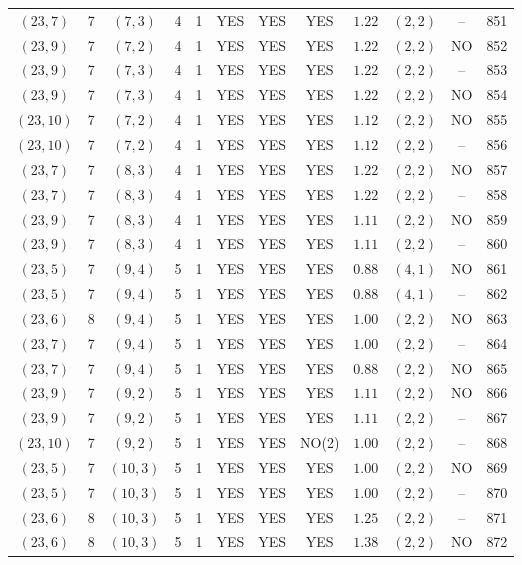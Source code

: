 \begin{longtable}{|c|c|c|c|c|c|c|c|c|c|c|c|}
$(23,7)$ & 7 & $(7,3)$ & 4 & 1 & YES & YES & YES & $1.22$ & $(2,2)$ & -- & 851\\
$(23,9)$ & 7 & $(7,2)$ & 4 & 1 & YES & YES & YES & $1.22$ & $(2,2)$ & NO & 852\\
$(23,9)$ & 7 & $(7,3)$ & 4 & 1 & YES & YES & YES & $1.22$ & $(2,2)$ & -- & 853\\
$(23,9)$ & 7 & $(7,3)$ & 4 & 1 & YES & YES & YES & $1.22$ & $(2,2)$ & NO & 854\\
$(23,10)$ & 7 & $(7,2)$ & 4 & 1 & YES & YES & YES & $1.12$ & $(2,2)$ & NO & 855\\
$(23,10)$ & 7 & $(7,2)$ & 4 & 1 & YES & YES & YES & $1.12$ & $(2,2)$ & -- & 856\\
$(23,7)$ & 7 & $(8,3)$ & 4 & 1 & YES & YES & YES & $1.22$ & $(2,2)$ & NO & 857\\
$(23,7)$ & 7 & $(8,3)$ & 4 & 1 & YES & YES & YES & $1.22$ & $(2,2)$ & -- & 858\\
$(23,9)$ & 7 & $(8,3)$ & 4 & 1 & YES & YES & YES & $1.11$ & $(2,2)$ & NO & 859\\
$(23,9)$ & 7 & $(8,3)$ & 4 & 1 & YES & YES & YES & $1.11$ & $(2,2)$ & -- & 860\\
$(23,5)$ & 7 & $(9,4)$ & 5 & 1 & YES & YES & YES & $0.88$ & $(4,1)$ & NO & 861\\
$(23,5)$ & 7 & $(9,4)$ & 5 & 1 & YES & YES & YES & $0.88$ & $(4,1)$ & -- & 862\\
$(23,6)$ & 8 & $(9,4)$ & 5 & 1 & YES & YES & YES & $1.00$ & $(2,2)$ & NO & 863\\
$(23,7)$ & 7 & $(9,4)$ & 5 & 1 & YES & YES & YES & $1.00$ & $(2,2)$ & -- & 864\\
$(23,7)$ & 7 & $(9,4)$ & 5 & 1 & YES & YES & YES & $0.88$ & $(2,2)$ & NO & 865\\
$(23,9)$ & 7 & $(9,2)$ & 5 & 1 & YES & YES & YES & $1.11$ & $(2,2)$ & NO & 866\\
$(23,9)$ & 7 & $(9,2)$ & 5 & 1 & YES & YES & YES & $1.11$ & $(2,2)$ & -- & 867\\
$(23,10)$ & 7 & $(9,2)$ & 5 & 1 & YES & YES & NO(2) & $1.00$ & $(2,2)$ & -- & 868\\
$(23,5)$ & 7 & $(10,3)$ & 5 & 1 & YES & YES & YES & $1.00$ & $(2,2)$ & NO & 869\\
$(23,5)$ & 7 & $(10,3)$ & 5 & 1 & YES & YES & YES & $1.00$ & $(2,2)$ & -- & 870\\
$(23,6)$ & 8 & $(10,3)$ & 5 & 1 & YES & YES & YES & $1.25$ & $(2,2)$ & -- & 871\\
$(23,6)$ & 8 & $(10,3)$ & 5 & 1 & YES & YES & YES & $1.38$ & $(2,2)$ & NO & 872\\

\end{longtable}

